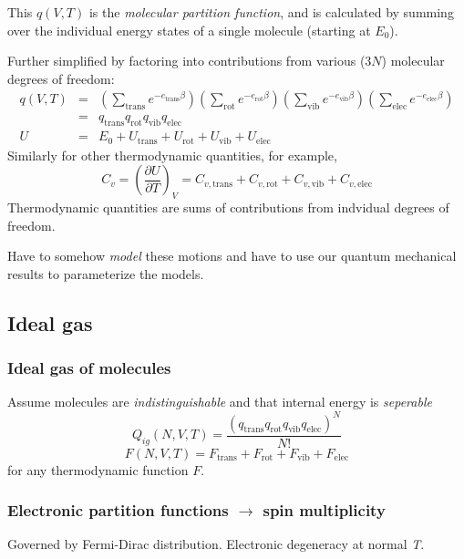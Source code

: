 \documentclass[11pt]{article}
\begin{document}
This \(q(V,T)\) is the \emph{molecular partition function}, and is calculated by
summing over the individual energy states of a single molecule (starting at \(E_0\)).

Further simplified by factoring into contributions from various (\(3N\)) molecular
degrees of freedom:
\begin{eqnarray}
  q(V,T)&=&\left(\sum_\mathrm{trans}
    e^{-e_\mathrm{trans}\beta}\right) \left(\sum_\mathrm{rot}
  e^{-e_\mathrm{rot}\beta}\right) \left( \sum_\mathrm{vib}
  e^{-e_\mathrm{vib}\beta} \right) \left( \sum_\mathrm{elec}
  e^{-e_\mathrm{elec}\beta}\right) \\
&=& q_\mathrm{trans}q_\mathrm{rot}q_\mathrm{vib}q_\mathrm{elec} \\
U & = & E_0 + U_\mathrm{trans}+U_\mathrm{rot}+U_\mathrm{vib}+U_\mathrm{elec}
\end{eqnarray}
Similarly for other thermodynamic quantities, for example,
\begin{equation}
  C_v=\left(\frac{\partial U}{\partial T}\right)_V = C_{v,\mathrm{trans}}+C_{v,\mathrm{rot}}+C_{v,\mathrm{vib}}+C_{v,\mathrm{elec}}
\end{equation}
Thermodynamic quantities are sums of contributions from indvidual degrees of
freedom.

Have to somehow \emph{model} these motions and have to use our quantum
mechanical results to parameterize the models.

\subsection{Ideal gas}
\label{sec:org29ac375}
\subsubsection{Ideal gas of molecules}
\label{sec:orgc2aa32a}
Assume molecules are \emph{indistinguishable} and that internal energy is \emph{seperable}
\[  Q_{ig}(N,V,T) = \frac{(q_\mathrm{trans}q_\mathrm{rot}q_\mathrm{vib}q_\mathrm{elec})^N}{N!} \]
\[ F(N,V,T) = F_\mathrm{trans}+ F_\mathrm{rot} + F_\mathrm{vib}+F_\mathrm{elec}\]
for any thermodynamic function \(F\).
\subsubsection{Electronic partition functions \(\rightarrow\) spin multiplicity}
\label{sec:org413f2ae}
Governed by Fermi-Dirac distribution. Electronic degeneracy at normal \emph{T}.
\end{document}
